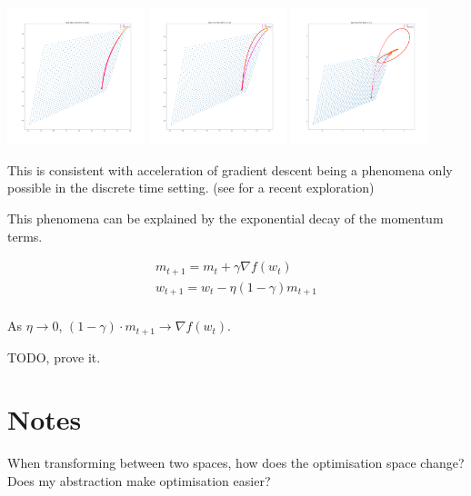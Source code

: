 \includegraphics[width=0.3\textwidth,height=0.25\textheight]{../../pictures/figures/vi_sgd-vs-vi_mom_0001.png}
\includegraphics[width=0.3\textwidth,height=0.25\textheight]{../../pictures/figures/vi_sgd-vs-vi_mom_001.png}
\includegraphics[width=0.3\textwidth,height=0.25\textheight]{../../pictures/figures/vi_sgd-vs-vi_mom_01.png}

This is consistent with acceleration of gradient descent being a phenomena only possible in the discrete time setting. (see \cite{Betancourt2018} for a recent exploration)

This phenomena can be explained by the exponential decay of the momentum terms.

\begin{align}
m_{t+1} = m_t + \gamma\nabla f(w_t) \\
w_{t+1} = w_t - \eta (1-\gamma) m_{t+1} \\
\end{align}

As \(\eta \to 0\), \((1-\gamma) \cdot m_{t+1} \to \nabla f(w_t)\).

TODO, prove it.

\section{Notes}

When transforming between two spaces, how does the optimisation space
change? Does my abstraction make optimisation easier?
